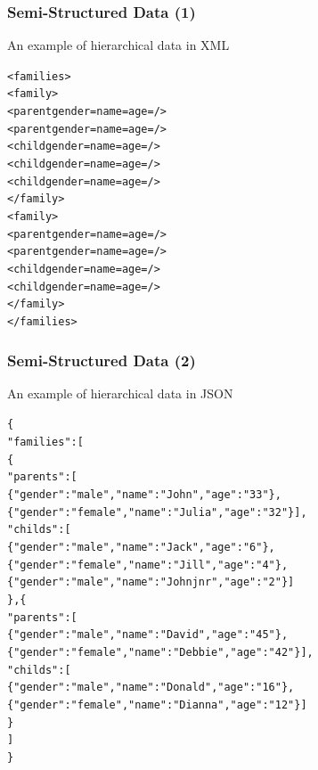 \documentclass[svgnames]{beamer}
\begin{document}
\begin{frame}[fragile]
\frametitle{Semi-Structured Data (1)}

An example of hierarchical data in XML
\begin{knitrout}\footnotesize
{}\color{fgcolor}\begin{kframe}
\begin{alltt}
<families>
 <family>
  <parent gender= name= age= />
  <parent gender= name= age= />
  <child gender= name= age= />
  <child gender= name= age= />
  <child gender= name= age= />
 </family>
 <family>
  <parent gender= name= age= />
  <parent gender= name= age= />
  <child gender= name= age= />
  <child gender= name= age= />
 </family>
</families>
\end{alltt}
\end{kframe}
\end{knitrout}

\end{frame}

\begin{frame}[fragile]
\frametitle{Semi-Structured Data (2)}

An example of hierarchical data in JSON
\begin{knitrout}\scriptsize
{}\color{fgcolor}\begin{kframe}
\begin{alltt}
\{
 "families": [
    \{
	      "parents" : [
        \{ "gender": "male", "name": "John", "age": "33" \},
        \{ "gender": "female", "name": "Julia", "age": "32" \} ],
	      "childs": [
	        \{ "gender": "male", "name": "Jack", "age": "6" \},
        \{ "gender": "female", "name": "Jill", "age": "4" \},	
        \{ "gender": "male", "name": "John jnr", "age": "2" \} ]
    \} , \{  
	      "parents" : [
        \{ "gender": "male", "name": "David", "age": "45" \},
        \{ "gender": "female", "name": "Debbie", "age": "42" \} ],
	      "childs": [
	        \{ "gender": "male", "name": "Donald", "age": "16" \},
        \{ "gender": "female", "name": "Dianna", "age": "12" \} ]
    \}
  ]
\}
\end{alltt}
\end{kframe}
\end{knitrout}
\end{frame}
\end{document}
